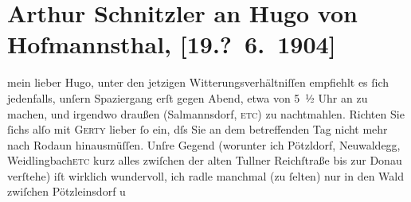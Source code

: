 

         
         \renewcommand{\erwaehntePersonen}{Personen: Hugo von Hofmannsthal, Gertrude von Hofmannsthal, Karl Kraus}
         \renewcommand{\erwaehnteOrte}{Orte: Exelbergstraße, Neuwaldegg, Niederlande, Pötzleinsdorf, Rodaun, Salmannsdorf, Sizilien, Weidlingbach, Wien}
         \renewcommand{\erwaehnteWerke}{}
               \section[Arthur Schnitzler an Hugo von Hofmannsthal, {[}19.? 6. 1904{]}]{ Arthur Schnitzler an Hugo von Hofmannsthal, {[}19.? 6. 1904{]}}\nopagebreak{}\rehead{ }\begin{ledgroupsized}[t]{13cm}\normalsize\beginnumbering \toendnotes[C]{\smallbreak\pagebreak[2]} 
\toendnotes[C]{\smallbreak}\pstart{}{\pb}mein lieber Hugo, \pend\pstart
           unter den jetzigen Witterungsverhältniſſen empfiehlt es ſich jedenfalls, unſern
               Spaziergang erſt gegen Abend, etwa von 5 ½ Uhr an zu
               machen, und irgendwo draußen (Salmannsdorf, \textsc{etc}) zu nachtmahlen. Richten Sie ſichs alſo mit \textsc{Gerty} lieber ſo ein, dſs Sie an dem betreffenden Tag nicht mehr nach Rodaun hinausmüſſen. Unſre Gegend (worunter ich
                  Pötzldorf, Neuwaldegg, {\pb}Weidlingbach\textsc{etc} kurz alles zwiſchen der alten Tullner Reichſtraße bis zur Donau verſtehe) iſt wirklich wundervoll, ich radle manchmal (zu
               ſelten) nur in den Wald zwiſchen Pötzleinsdorf u

\end{ledgroupsized}
